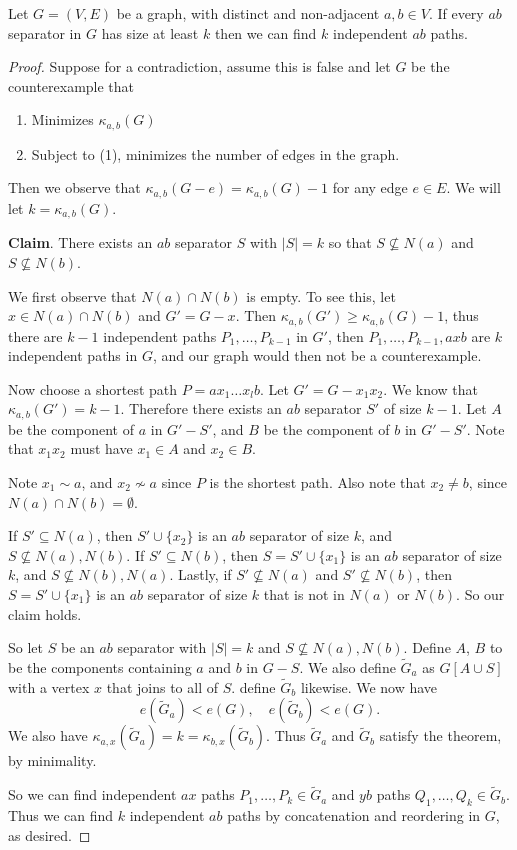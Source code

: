 \begin{theorem}
	Let $G = (V, E)$ be a graph, with distinct and non-adjacent $a, b \in V$. If every $ab$ separator in $G$ has size at least $k$ then we can find $k$ independent $ab$ paths.
\end{theorem}
\begin{proof}
	Suppose for a contradiction, assume this is false and let $G$ be the counterexample that 
	\begin{enumerate}[label=(\arabic*)]
		\item Minimizes $\kappa_{a, b}(G)$
		\item Subject to (1), minimizes the number of edges in the graph.
	\end{enumerate}
	Then we observe that $\kappa_{a, b}(G - e) = \kappa_{a, b}(G) - 1$ for any edge $e \in E$. We will let $k = \kappa_{a, b}(G)$.

	\textbf{Claim}. There exists an $ab$ separator $S$ with $|S| = k$ so that $S \not \subseteq N(a)$ and $S \not \subseteq N(b)$.

	We first observe that $N(a) \cap N(b)$ is empty. To see this, let $x \in N(a) \cap N(b)$ and $G' = G-x$. Then $\kappa_{a, b}(G') \geq \kappa_{a, b}(G) - 1$, thus there are $k - 1$ independent paths $P_1, \dots, P_{k - 1}$ in $G'$, then $P_1, \dots, P_{k - 1}, axb$ are $k$ independent paths in $G$, and our graph would then not be a counterexample.

	Now choose a shortest path $P = a x_1 \dots x_l b$. Let $G' = G - x_1 x_2$. We know that $\kappa_{a, b}(G') = k - 1$. Therefore there exists an $ab$ separator $S'$ of size $k - 1$.
	Let $A$ be the component of $a$ in $G' - S'$, and $B$ be the component of $b$ in $G' - S'$. Note that $x_1x_2$ must have $x_1 \in A$ and $x_2 \in B$. 

	Note $x_1 \sim a$, and $x_2 \not \sim a$ since $P$ is the shortest path. Also note that $x_2 \neq b$, since $N(a) \cap N(b) = \emptyset$. 

	If $S' \subseteq N(a)$, then $S' \cup \{x_2\}$ is an $ab$ separator of size $k$, and $S \not \subseteq N(a), N(b)$. If $S' \subseteq N(b)$, then $S = S' \cup \{x_1\}$ is an $ab$ separator of size $k$, and $S \not \subseteq N(b), N(a)$. Lastly, if $S' \not \subseteq N(a)$ and $S' \not \subseteq N(b)$, then $S = S' \cup \{x_1\}$ is an $ab$ separator of size $k$ that is not in $N(a)$ or $N(b)$. So our claim holds.

	So let $S$ be an $ab$ separator with $|S| = k$ and $S \not \subseteq N(a), N(b)$. Define $A$, $B$ to be the components containing $a$ and $b$ in $G - S$. We also define $\tilde{G}_a$ as $G[A\cup S]$ with a vertex $x$ that joins to all of $S$. define $\tilde{G}_b$ likewise. We now have
	$$
	e(\tilde{G}_a) < e(G), \quad e(\tilde{G}_b) < e(G).
	$$
	We also have $\kappa_{a, x}(\tilde{G}_a) = k = \kappa_{b, x}(\tilde{G}_b)$. Thus $\tilde{G}_a$ and $\tilde{G}_b$ satisfy the theorem, by minimality. 

	So we can find independent $ax$ paths $P_1, \dots, P_k \in \tilde{G}_a$ and $yb$ paths $Q_1, \dots, Q_k \in \tilde{G}_b$. Thus we can find $k$ independent $ab$ paths by concatenation and reordering in $G$, as desired.
\end{proof}

